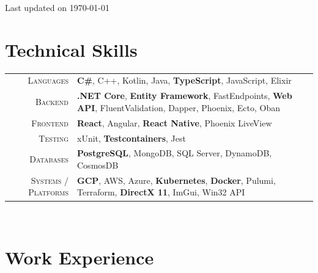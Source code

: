 \documentclass[a4paper,10pt]{extarticle} %
\begin{document}
\vspace{-0.6cm}
\hfill {\textcolor{secondary}{\scriptsize Last updated on \today}


\section{\textcolor{primary}{Technical Skills}}
\begin{tabular}{r|p{15cm}}
\textsc{Languages} & \textbf{C\#}, C++, Kotlin, Java, \textbf{TypeScript}, JavaScript, Elixir\\

\textsc{Backend} & \textbf{.NET Core}, \textbf{Entity Framework}, FastEndpoints, \textbf{Web API}, FluentValidation, Dapper, Phoenix, Ecto, Oban\\

\textsc{Frontend} & \textbf{React}, Angular, \textbf{React Native}, Phoenix LiveView\\

\textsc{Testing} & xUnit, \textbf{Testcontainers}, Jest\\

\textsc{Databases} & \textbf{PostgreSQL}, MongoDB, SQL Server, DynamoDB, CosmosDB\\

\textsc{Systems / Platforms} & \textbf{GCP}, AWS, Azure, \textbf{Kubernetes}, \textbf{Docker}, Pulumi, Terraform, \textbf{DirectX 11}, ImGui, Win32 API\\
\end{tabular}
\\

\section{\textcolor{primary}{Work Experience}}


}
\end{document}
